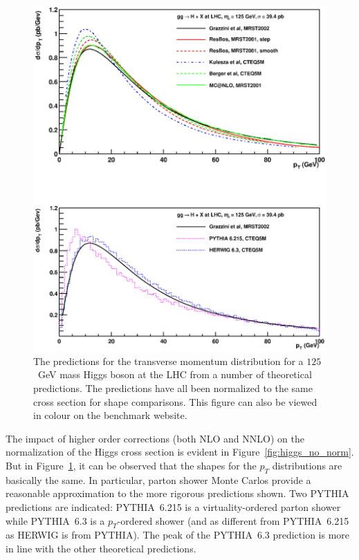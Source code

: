 \documentclass[12pt]{iopart}
\begin{document}
\begin{figure}[t]
\begin{center}
\includegraphics[width=12cm]{higgs_pt_comparison_all.eps}
\end{center}
\vspace*{-1cm}
\caption{
The predictions for the transverse momentum distribution for a $125$~GeV mass Higgs boson at the LHC
from a number of theoretical predictions. The predictions have all been normalized to the same cross
section for shape comparisons. This figure can also be viewed in colour on the benchmark website. 
\label{fig:higgs_norm}
}
\end{figure}
%
The impact of higher order corrections (both NLO and NNLO) on the
normalization of the Higgs cross section is evident in Figure~\ref{fig:higgs_no_norm}. But in
Figure~\ref{fig:higgs_norm}, it can be observed that the shapes for the $p_T$ distributions are basically the
same. In particular, parton shower Monte Carlos provide a reasonable approximation to the more rigorous
predictions shown. Two PYTHIA predictions are indicated: PYTHIA~6.215 is a virtuality-ordered parton shower
while PYTHIA~6.3 is a $p_T$-ordered shower (and as different from PYTHIA~6.215 as HERWIG is from PYTHIA).  The
peak of the PYTHIA~6.3 prediction is more in line with the other theoretical predictions. 
\end{document}
